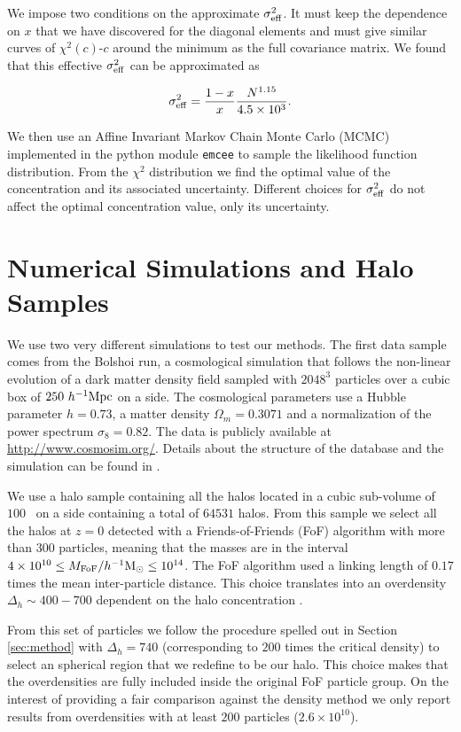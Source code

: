 \documentclass{emulateapj}
\newcommand{\hMpc}{{\ifmmode{h^{-1}{\rm Mpc}}\else{$h^{-1}$Mpc}\fi}}
\newcommand{\hMsun}{{\ifmmode{h^{-1}{\rm {M_{\odot}}}}\else{$h^{-1}{\rm{M_{\odot}}}$}\fi}}
\begin{document}
We impose two conditions on the approximate $\sigma_{\rm eff}^{2}$. It
must keep the dependence on $x$ that we have discovered for the
diagonal elements and must give similar curves of $\chi^{2}(c)$-$c$
around the minimum as the full covariance matrix.
We found that this effective $\sigma_{\rm eff}^2$ can be approximated
as 

\begin{equation}
\sigma_{\rm eff}^2 = \frac{1-x}{x}\frac{N^{1.15}}{4.5\times 10^3}.
\end{equation}

We then use an Affine Invariant Markov Chain Monte Carlo (MCMC)
implemented in the python module {\texttt{emcee}} \citep{emcee} to sample the
likelihood function distribution.
From the $\chi^2$ distribution we find the optimal value of the
concentration and its associated uncertainty. Different choices for
$\sigma^2_{\rm eff}$ do not affect the optimal concentration value,
only its uncertainty.


\section{Numerical Simulations and Halo Samples}

We use two very different simulations to test our methods.
The first data sample comes from the Bolshoi run, a cosmological
simulation that follows the non-linear evolution of a dark matter density field
sampled with $2048^3$ particles over a cubic box of $250\ \hMpc$ on a side.  
The cosmological parameters use a Hubble parameter $h=0.73$, a matter density
$\Omega_m=0.3071$ and a normalization of the power spectrum
$\sigma_8=0.82$. 
The data is publicly available at \url{http://www.cosmosim.org/}.  
Details about the structure of the database and the simulation can be
found in \citep{2013AN....334..691R}.

We use a halo sample containing all the halos located in a cubic
sub-volume of $100$ \hMpc\ on a side containing a total of $64531$
halos. 
From this sample we select all the halos at $z=0$ detected with a
Friends-of-Friends (FoF) algorithm with more than 300 particles,
meaning that the masses are in the interval $4\times 10^{10}\leq
M_{\rm FoF}/\hMsun \leq 10^{14}$.  The FoF algorithm used a linking
length of $0.17$ times the mean inter-particle distance.  
This choice translates into an overdensity $\Delta_h\sim 400-700$
dependent on the halo concentration \citep{More2011}.

From this set of particles we follow the procedure spelled out in
Section \ref{sec:method} with $\Delta_h=740$ (corresponding to $200$
times the critical density) to select an spherical region that we
redefine to be our halo.  
This choice makes that the overdensities are fully included inside the
original FoF particle group.   
On the interest of providing a fair comparison against the density
method we only report results from overdensities with at least $200$
particles ($2.6\times 10^{10}$\hMsun). 
\end{document}
